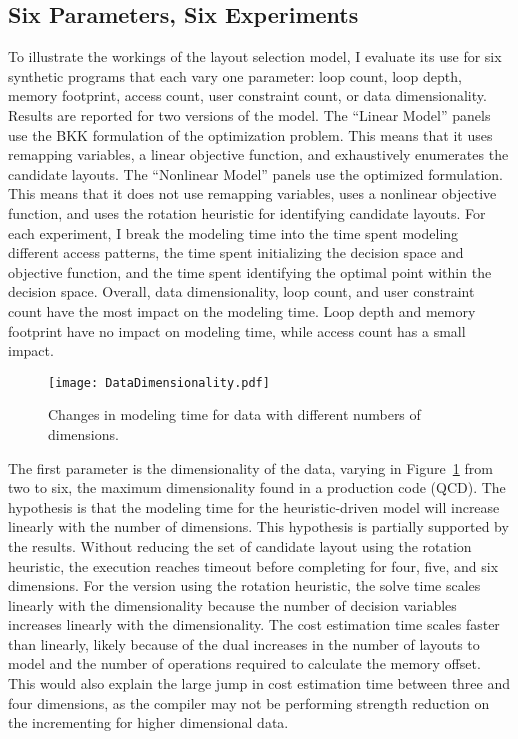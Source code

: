 \subsection{Six Parameters, Six Experiments}\label{sec:modelExperiments}

To illustrate the workings of the layout selection model, I evaluate its use for six synthetic programs that each vary one parameter: loop count, loop depth, memory footprint, access count, user constraint count, or data dimensionality.
Results are reported for two versions of the model.
The ``Linear Model'' panels use the BKK formulation of the optimization problem.
This means that it uses remapping variables, a linear objective function, and exhaustively enumerates the candidate layouts.
The ``Nonlinear Model'' panels use the optimized \FormatDecisions{} formulation.
This means that it does not use remapping variables, uses a nonlinear objective function, and uses the rotation heuristic for identifying candidate layouts.
For each experiment, I break the modeling time into the time spent modeling different access patterns, the time spent initializing the decision space and objective function, and the time spent identifying the optimal point within the decision space. 
Overall, data dimensionality, loop count, and user constraint count have the most impact on the modeling time.
Loop depth and memory footprint have no impact on modeling time, while access count has a small impact.

\begin{figure}
	\texttt{[image: DataDimensionality.pdf]}
	\caption{Changes in modeling time for data with different numbers of dimensions.}\label{DataDimensionality}
\end{figure}
The first parameter is the dimensionality of the data, varying in Figure~\ref{DataDimensionality} from two to six, the maximum dimensionality found in a production code (QCD).
The hypothesis is that the modeling time for the heuristic-driven model will increase linearly with the number of dimensions.
This hypothesis is partially supported by the results.
Without reducing the set of candidate layout using the rotation heuristic, the execution reaches timeout before completing for four, five, and six dimensions.
For the version using the rotation heuristic, the solve time scales linearly with the dimensionality because the number of decision variables increases linearly with the dimensionality.
The cost estimation time scales faster than linearly, likely because of the dual increases in the number of layouts to model and the number of operations required to calculate the memory offset. 
This would also explain the large jump in cost estimation time between three and four dimensions, as the compiler may not be performing strength reduction on the incrementing for higher dimensional data.

